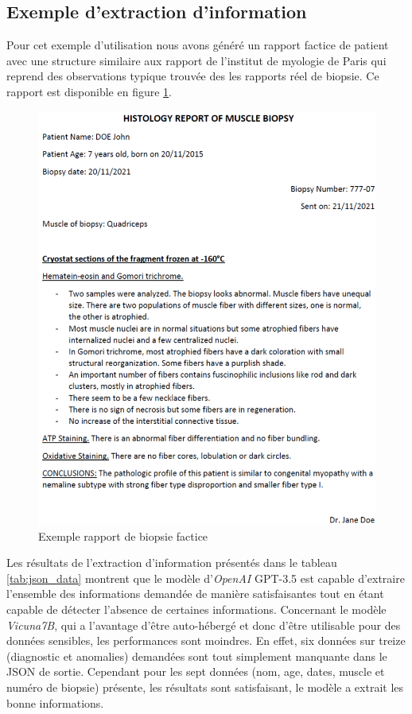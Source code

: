 \subsection{Exemple d'extraction d'information}
Pour cet exemple d'utilisation nous avons généré un rapport factice de patient avec une structure similaire aux rapport de l'institut de myologie de Paris qui reprend des observations typique trouvée des les rapports réel de biopsie. Ce rapport est disponible en figure \ref{fig:factice_report}. 
\begin{figure}[htbp]
  \centering
  \includegraphics[width=1\textwidth]{figures/pdf_biopsie.png}
  \caption[Rapport de biopsie factice]{Exemple rapport de biopsie factice}
  \label{fig:factice_report}
\end{figure}

Les  résultats de l'extraction d'information présentés dans le tableau \ref{tab:json_data} montrent que le modèle d'\textit{OpenAI} GPT-3.5 est capable d'extraire l'ensemble des informations demandée de manière satisfaisantes tout en étant capable de détecter l'absence de certaines informations. Concernant le modèle \textit{Vicuna7B}, qui a l'avantage d'être auto-hébergé et donc d'être utilisable pour des données sensibles, les performances sont moindres. En effet, six données sur treize (diagnostic et anomalies) demandées sont tout simplement manquante dans le JSON de sortie. Cependant pour les sept données (nom, age, dates, muscle et numéro de biopsie) présente, les résultats sont satisfaisant, le modèle a extrait les bonne informations.

